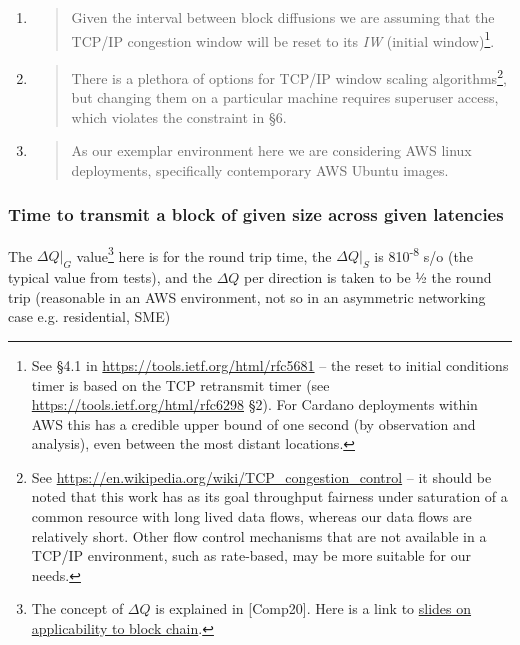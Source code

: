 \documentclass[11pt,a4paper]{article}
\begin{document}
\begin{enumerate}
\def\labelenumi{\arabic{enumi}.}
\item
  \begin{quote}
  Given the interval between block diffusions we are assuming that the
  TCP/IP congestion window will be reset to its \emph{IW} (initial
  window)\footnote{See §4.1 in
    \href{https://tools.ietf.org/html/rfc5681}{{https://tools.ietf.org/html/rfc5681}}
    -- the reset to initial conditions timer is based on the TCP
    retransmit timer (see
    \href{https://tools.ietf.org/html/rfc6298}{{https://tools.ietf.org/html/rfc6298}}
    §2). For Cardano deployments within AWS this has a credible upper
    bound of one second (by observation and analysis), even between the
    most distant locations.}.
  \end{quote}
\item
  \begin{quote}
  There is a plethora of options for TCP/IP window scaling
  algorithms\footnote{See
    \href{https://en.wikipedia.org/wiki/TCP_congestion_control}{{https://en.wikipedia.org/wiki/TCP\_congestion\_control}}
    -- it should be noted that this work has as its goal throughput
    fairness under saturation of a common resource with long lived data
    flows, whereas our data flows are relatively short. Other flow
    control mechanisms that are not available in a TCP/IP environment,
    such as rate-based, may be more suitable for our needs.}, but
  changing them on a particular machine requires superuser access, which
  violates the constraint in §6.
  \end{quote}
\item
  \begin{quote}
  As our exemplar environment here we are considering AWS linux
  deployments, specifically contemporary AWS Ubuntu images.
  \end{quote}
\end{enumerate}

\subsubsection{Time to transmit a block of given size across given latencies}
\label{time-to-transmit-a-block-of-given-size-across-given-latencies}

The $\Delta{}Q|_G$ value\footnote{The concept of $\Delta{}Q$ is
  explained in {[}Comp20{]}. Here is a link to
  \href{https://www.slideshare.net/pnsol-slides/q-and-blockchain-83943683}{{slides
  on applicability to block chain}}.} here is for the round trip time,
the $\Delta{}Q|_S$ is 8\texttimes{}10\textsuperscript{-8} s/o (the
typical value from tests), and the $\Delta{}Q$ per direction is taken to be ½ the
round trip (reasonable in an AWS environment, not so in an asymmetric
networking case e.g. residential, SME)
\end{document}
